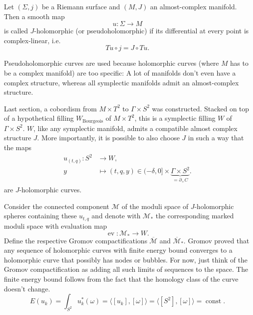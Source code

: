 \begin{definition}
    Let $(\Sigma, j)$ be a Riemann surface and $(M, J)$ an almost-complex manifold. Then a smooth map
    \[
        u \colon \Sigma \to M
    \]
    is called $J$-holomorphic (or pseudoholomorphic) if its differential at every point is complex-linear, i.e.
    \[
        Tu \circ j = J \circ Tu.
    \]
\end{definition}

Pseudoholomorphic curves are used because holomorphic curves (where $M$ has to be a complex manifold) are too specific: 
A lot of manifolds don't even have a complex structure, whereas all symplectic manifolds admit an almost-complex structure.

%

Last section, a cobordism from $M\times T^2$ to $\Gamma \times S^2$ was constructed.
Stacked on top of a hypothetical filling $W_\text{Bourgeois}$ of $M\times T^2$, this is a symplectic filling $W$ of $\Gamma \times S^2$.
$W$, like any symplectic manifold, admits a compatible almost complex structure $J$.
More importantly, it is possible to also choose $J$ in such a way that the maps
\begin{align*}
    u_{(t,q)} \colon S^2 &\to W,\\
    y &\mapsto (t, q, y) \in (-\delta, 0] \times \underbrace{\Gamma \times S^2}_{= \partial_+ C}.
\end{align*}
are $J$-holomorphic curves.

Consider the connected component $\mathcal{M}$ of the moduli space of $J$-holomorphic spheres containing these $u_{t,q}$
and denote with $\mathcal{M}_*$ the corresponding marked moduli space with evaluation map
\[
    \operatorname{ev}\colon \mathcal{M}_* \to W.
\]
Define the respective Gromov compactifications $\overline{\mathcal{M}}$ and $\overline{\mathcal{M}}_*$.
Gromov proved that any sequence of holomorphic curves with finite energy bound converges to a
holomorphic curve that possibly has nodes or bubbles.
For now, just think of the Gromov compactification as adding all such limits of sequences to the space.
The finite energy bound follows from the fact that the homology class of the curve doesn't change.
\[
    E(u_k) = \int_{S^2} u_k^*(\omega) = \langle [u_k], [\omega] \rangle = \langle [S^2], [\omega]\rangle = \operatorname{const}.
\]

